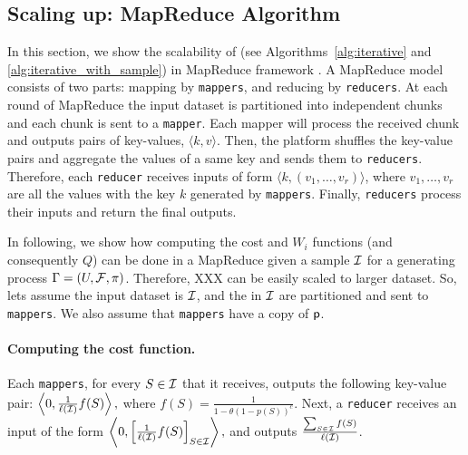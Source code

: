 \subsection{Scaling up: MapReduce Algorithm}\label{sec:mapreduce}
In this section, we show the scalability of \algoname (see Algorithms~\ref{alg:iterative} and \ref{alg:iterative_with_sample}) in MapReduce framework \cite{dean2008mapreduce}. A MapReduce model consists of two parts: mapping by \texttt{mappers}, and reducing by \texttt{reducers}. At each round of MapReduce the input dataset is partitioned into independent chunks and each chunk is sent to a \texttt{mapper}. Each mapper will process the received chunk and outputs pairs of key-values, $\langle k, v \rangle$. Then, the  platform shuffles the key-value pairs and aggregate the values of a same key and sends them to \texttt{reducers}. Therefore, each \texttt{reducer} receives inputs of form $\langle k, (v_1, \ldots, v_r) \rangle$, where $v_1, \ldots, v_r$ are all the values with the key $k$ generated by \texttt{mappers}. Finally, \texttt{reducers} process their inputs and return the final outputs.

In following, we show how computing the cost and $W_i$ functions (and
consequently $Q$)  can be done in a MapReduce given a sample $\mathcal{I}$ for a
generating process $\Gamma=(U,\mathcal{F},\pi)$. Therefore, XXX can be easily scaled to larger dataset.
So, lets assume the input dataset is $\mathcal{I}$, and the {\ins} in $\mathcal{I}$ are partitioned and sent to \texttt{mappers}. We also assume that \texttt{mappers} have a copy of $\mathsf{p}$.


\paragraph{\bf Computing the cost function.}
Each \texttt{mappers}, for every $S\in \mathcal{I}$ that it receives, outputs the following key-value pair:
$\left\langle 0,  \frac{1}{\ell(\mathcal{I})}f(S) \right\rangle,$
where $f(S) = \frac{1}{1- \theta(1-p(S))^c}$.
Next, a \texttt{reducer} receives an input of the form
$\left\langle 0,  \left[\frac{1}{\ell(\mathcal{I})}f(S)\right]_{S\in \mathcal{I}}  \right\rangle,$
and outputs $\frac{\sum_{S\in \mathcal{I}}f(S)}{\ell(\mathcal{I})}$.

